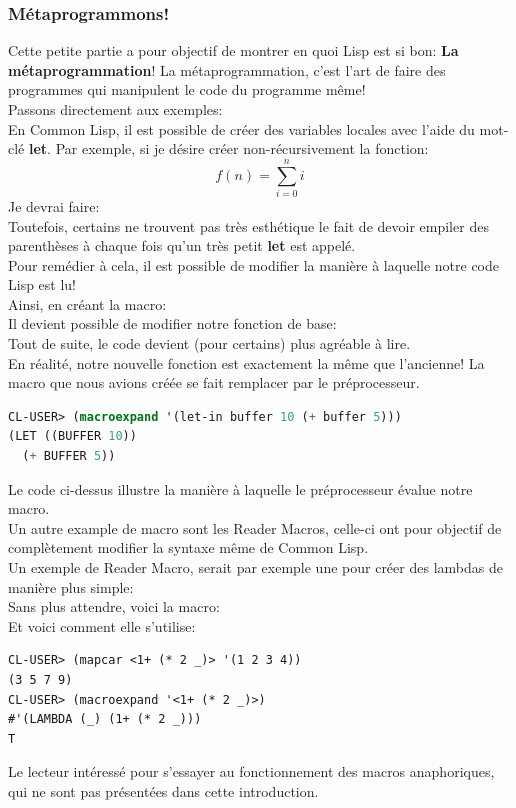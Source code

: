 \documentclass[a4paper, 12pt]{article}
\numberwithin{equation}{subsection}
\begin{document}
\subsubsection{Métaprogrammons!}
Cette petite partie a pour objectif de montrer en quoi Lisp est si bon: {\bf La métaprogrammation}!
La métaprogrammation, c'est l'art de faire des programmes qui manipulent le code du programme même!\\
Passons directement aux exemples:\\
En Common Lisp, il est possible de créer des variables locales avec l'aide du mot-clé {\bf let}. Par exemple, si je désire créer non-récursivement la fonction: \\
$$f(n) = \sum_{i=0}^{n}i$$
Je devrai faire: \\

Toutefois, certains ne trouvent pas très esthétique le fait de devoir empiler des parenthèses à chaque fois qu'un très petit {\bf let} est appelé. \\
Pour remédier à cela, il est possible de modifier la manière à laquelle notre code Lisp est lu! \\
Ainsi, en créant la macro: \\

Il devient possible de modifier notre fonction de base: \\

Tout de suite, le code devient (pour certains) plus agréable à lire.\\
En réalité, notre nouvelle fonction est exactement la même que l'ancienne! La macro que nous avions créée se fait remplacer par le préprocesseur.
\begin{lstlisting}[language=Lisp]
CL-USER> (macroexpand '(let-in buffer 10 (+ buffer 5)))
(LET ((BUFFER 10))
  (+ BUFFER 5))
\end{lstlisting}
Le code ci-dessus illustre la manière à laquelle le préprocesseur évalue notre macro.\\
Un autre example de macro sont les Reader Macros, celle-ci ont pour objectif de complètement modifier la syntaxe même de Common Lisp. \\
Un exemple de Reader Macro, serait par exemple une pour créer des lambdas de manière plus simple:\\
Sans plus attendre, voici la macro: \\

Et voici comment elle s'utilise: \\
\begin{lstlisting}
CL-USER> (mapcar <1+ (* 2 _)> '(1 2 3 4))
(3 5 7 9)
CL-USER> (macroexpand '<1+ (* 2 _)>)
#'(LAMBDA (_) (1+ (* 2 _)))
T
\end{lstlisting}
Le lecteur intéressé pour s'essayer au fonctionnement des macros anaphoriques, qui ne sont pas présentées dans cette introduction.\\
\end{document}

